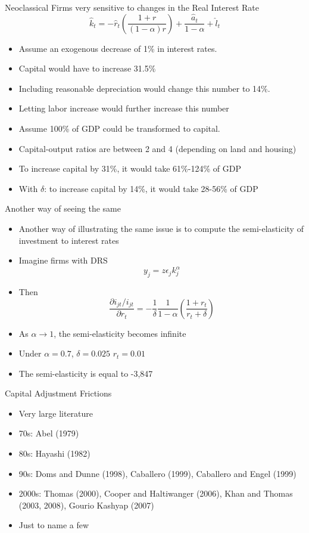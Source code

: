 \documentclass[english,xcolor=svgnames,aspectratio=169]{beamer}
\begin{document}
\begin{frame}{Neoclassical Firms very sensitive to changes in the Real Interest Rate}
$$\hat{k}_t = - \hat{r}_t \left(\frac{1+r}{(1-\alpha)r}\right) + \frac{\hat{a}_t}{1-\alpha} + \hat{l}_t$$
\begin{itemize}
\item Assume an exogenous decrease of 1\% in interest rates.
\item Capital would have to increase 31.5\%  
\item Including reasonable depreciation would change this number to 14\%.
\item Letting labor increase would further increase this number
\item Assume 100\% of GDP could be transformed to capital.
\item Capital-output ratios are between 2 and 4 (depending on land and housing)
\item To increase capital by 31\%, it would take 61\%-124\% of GDP
\item With $\delta$: to increase capital by 14\%, it would take 28-56\% of GDP
\end{itemize}
\end{frame}


\begin{frame}{Another way of seeing the same}
\begin{itemize}
\item Another way of illustrating the same issue is to compute the semi-elasticity of investment to interest rates
\item Imagine firms with DRS
\[y_j = z \epsilon_j k_j^{\alpha}\]
\item Then
\[\frac{\partial i_{jt}/i_{jt}}{ \partial r_t} = - \frac{1}{\delta} \frac{1}{1-\alpha}\left(\frac{1+r_t}{r_t + \delta}\right) \]
\item As $\alpha \rightarrow 1$, the semi-elasticity becomes infinite
\item Under $\alpha = 0.7$, $\delta = 0.025$ $r_t = 0.01$
\item The semi-elasticity is equal to -3,847
\end{itemize}
\end{frame}


\begin{frame}{Capital Adjustment Frictions}
\begin{itemize}
\item Very large literature
\item 70s: Abel (1979)
\item 80s: Hayashi (1982)
\item 90s: Doms and Dunne (1998), Caballero (1999), Caballero and Engel (1999)
\item 2000s: Thomas (2000), Cooper and Haltiwanger (2006), Khan and Thomas (2003, 2008), Gourio Kashyap (2007)
\item Just to name a few
\end{itemize}
\end{frame}
\end{document}
